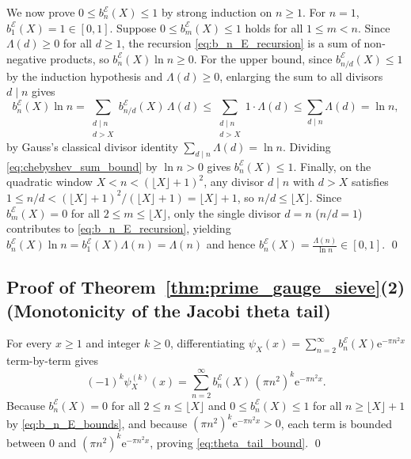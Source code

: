 \documentclass[11pt,reqno,a4paper]{amsart}
\theoremstyle{plain}
\theoremstyle{definition}
\theoremstyle{remark}
\numberwithin{equation}{section}
\newcommand{\ee}{\mathrm{e}}
\begin{document}
We now prove $0 \le b_n^{\mathcal{E}}(X) \le 1$ by strong induction on $n \ge 1$. For $n = 1$, $b_1^{\mathcal{E}}(X) = 1 \in [0,1]$. Suppose $0 \le b_m^{\mathcal{E}}(X) \le 1$ holds for all $1 \le m < n$. Since $\Lambda(d) \ge 0$ for all $d \ge 1$, the recursion \eqref{eq:b_n_E_recursion} is a sum of non-negative products, so $b_n^{\mathcal{E}}(X)\ln n \ge 0$. For the upper bound, since $b_{n/d}^{\mathcal{E}}(X) \le 1$ by the induction hypothesis and $\Lambda(d) \ge 0$, enlarging the sum to all divisors $d \mid n$ gives
\begin{equation}\label{eq:chebyshev_sum_bound}
  b_n^{\mathcal{E}}(X)\ln n
  = \sum_{\substack{d \mid n \\ d > X}} b_{n/d}^{\mathcal{E}}(X)\,\Lambda(d)
  \le \sum_{\substack{d \mid n \\ d > X}} 1 \cdot \Lambda(d)
  \le \sum_{d \mid n} \Lambda(d) = \ln n,
\end{equation}
by Gauss's classical divisor identity $\sum_{d\mid n}\Lambda(d) = \ln n$. Dividing \eqref{eq:chebyshev_sum_bound} by $\ln n > 0$ gives $b_n^{\mathcal{E}}(X) \le 1$. Finally, on the quadratic window $X < n < (\lfloor X\rfloor + 1)^2$, any divisor $d \mid n$ with $d > X$ satisfies $1 \le n/d < (\lfloor X\rfloor + 1)^2 / (\lfloor X\rfloor + 1) = \lfloor X\rfloor + 1$, so $n/d \le \lfloor X\rfloor$. Since $b_m^{\mathcal{E}}(X) = 0$ for all $2 \le m \le \lfloor X\rfloor$, only the single divisor $d = n$ ($n/d = 1$) contributes to \eqref{eq:b_n_E_recursion}, yielding $b_n^{\mathcal{E}}(X)\ln n = b_1^{\mathcal{E}}(X)\Lambda(n) = \Lambda(n)$ and hence $b_n^{\mathcal{E}}(X) = \frac{\Lambda(n)}{\ln n} \in [0,1]$. \qed

\subsection{Proof of Theorem~\ref{thm:prime_gauge_sieve}(2) (Monotonicity of the Jacobi theta tail)}\label{app:theta_tail}
For every $x \ge 1$ and integer $k \ge 0$, differentiating $\psi_X(x) = \sum_{n=2}^\infty b_n^{\mathcal{E}}(X)\ee^{-\pi n^2 x}$ term-by-term gives
\begin{equation*}
  (-1)^k\psi_X^{(k)}(x) = \sum_{n=2}^{\infty} b_n^{\mathcal{E}}(X)\,(\pi n^2)^k \ee^{-\pi n^2 x}.
\end{equation*}
Because $b_n^{\mathcal{E}}(X) = 0$ for all $2 \le n \le \lfloor X\rfloor$ and $0 \le b_n^{\mathcal{E}}(X) \le 1$ for all $n \ge \lfloor X\rfloor + 1$ by \eqref{eq:b_n_E_bounds}, and because $(\pi n^2)^k \ee^{-\pi n^2 x} > 0$, each term is bounded between $0$ and $(\pi n^2)^k \ee^{-\pi n^2 x}$, proving \eqref{eq:theta_tail_bound}. \qed
\end{document}

